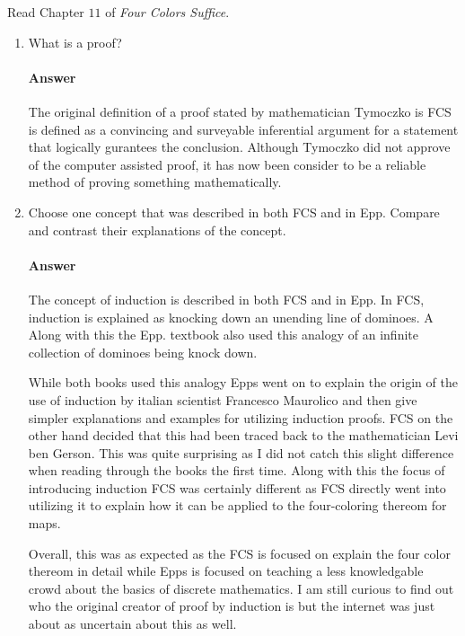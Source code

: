 \documentclass{article}
\begin{document}
Read Chapter $11$ of \emph{Four Colors Suffice}.

\begin{enumerate}

    \item What is a proof?

        \paragraph{Answer}

        The original definition of a proof stated by mathematician Tymoczko is FCS is defined as a convincing and surveyable inferential argument for a statement that logically gurantees the conclusion. 
        Although Tymoczko did not approve of the computer assisted proof, it has now been consider to be a reliable method of proving something mathematically.


    \item Choose one concept that was described in both FCS and in Epp.
        Compare and contrast their explanations of the concept.

        \paragraph{Answer}

        The concept of induction is described in both FCS and in Epp. In FCS, induction is explained as knocking down an unending line of dominoes. A
        Along with this the Epp. textbook also used this analogy of an infinite collection of dominoes being knock down.

        While both books used this analogy Epps went on to explain the origin of the use of induction by italian scientist Francesco Maurolico and then give simpler 
        explanations and examples for utilizing induction proofs. FCS on the other hand decided that this had been traced back to the mathematician Levi ben Gerson. This 
        was quite surprising as I did not catch this slight difference when reading through the books the first time. Along with this the focus of introducing
         induction FCS was certainly different as FCS directly went into utilizing it to explain how it can be applied to the four-coloring thereom for maps. 

        Overall, this was as expected as the FCS is focused on explain the four color thereom in detail while Epps is focused on teaching a less knowledgable crowd about
        the basics of discrete mathematics. I am still curious to find out who the original creator of proof by induction is but the internet was just about as 
        uncertain about this as well.

\end{enumerate}
\end{document}
